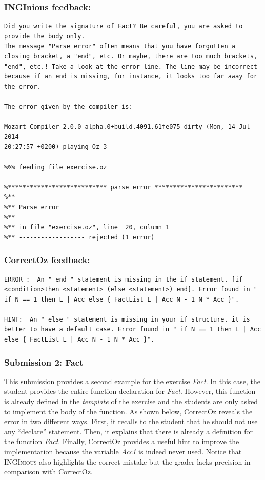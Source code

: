 \documentclass[11pt,a4paper,twoside,openright]{report}
\begin{document}
\subsubsection*{INGInious feedback:}
\begin{lstlisting}
Did you write the signature of Fact? Be careful, you are asked to provide the body only.
The message "Parse error" often means that you have forgotten a closing bracket, a "end", etc. Or maybe, there are too much brackets, "end", etc.! Take a look at the error line. The line may be incorrect because if an end is missing, for instance, it looks too far away for the error.

The error given by the compiler is:

Mozart Compiler 2.0.0-alpha.0+build.4091.61fe075-dirty (Mon, 14 Jul 2014 
20:27:57 +0200) playing Oz 3

%%% feeding file exercise.oz

%*************************** parse error ************************
%**
%** Parse error
%**
%** in file "exercise.oz", line  20, column 1
%** ------------------ rejected (1 error)
\end{lstlisting}

\subsubsection*{CorrectOz feedback:}
\begin{lstlisting}
ERROR :  An " end " statement is missing in the if statement. [if <condition>then <statement> (else <statement>) end]. Error found in " if N == 1 then L | Acc else { FactList L | Acc N - 1 N * Acc }".

HINT:  An " else " statement is missing in your if structure. it is better to have a default case. Error found in " if N == 1 then L | Acc else { FactList L | Acc N - 1 N * Acc }".
\end{lstlisting}

\subsubsection{Submission 2: Fact}
This submission provides a second example for the 
exercise \textit{Fact}. In this case, the student provides the entire function 
declaration for \textit{Fact}. However, this function is already defined in the 
\textit{template} of the exercise and the students are only asked to implement 
the body of the function. As shown below, CorrectOz 
reveals the error in two different ways. First, it recalls to the student that he 
should not use any \enquote{declare} statement. Then, it explains that there is 
already a 
definition for the function \textit{Fact}. Finally, CorrectOz provides a useful 
hint to improve the implementation because the variable \textit{Acc1} is indeed 
never used. Notice that \textsc{INGInious} also highlights the correct mistake 
but the grader lacks precision in comparison with CorrectOz.
\end{document}

